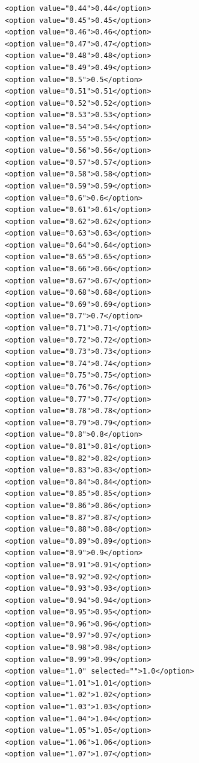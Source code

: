 \documentclass[
  letterpaper,
  DIV=11,
  numbers=noendperiod]{scrartcl}
\begin{document}
\begin{verbatim}
      <option value="0.44">0.44</option>
      <option value="0.45">0.45</option>
      <option value="0.46">0.46</option>
      <option value="0.47">0.47</option>
      <option value="0.48">0.48</option>
      <option value="0.49">0.49</option>
      <option value="0.5">0.5</option>
      <option value="0.51">0.51</option>
      <option value="0.52">0.52</option>
      <option value="0.53">0.53</option>
      <option value="0.54">0.54</option>
      <option value="0.55">0.55</option>
      <option value="0.56">0.56</option>
      <option value="0.57">0.57</option>
      <option value="0.58">0.58</option>
      <option value="0.59">0.59</option>
      <option value="0.6">0.6</option>
      <option value="0.61">0.61</option>
      <option value="0.62">0.62</option>
      <option value="0.63">0.63</option>
      <option value="0.64">0.64</option>
      <option value="0.65">0.65</option>
      <option value="0.66">0.66</option>
      <option value="0.67">0.67</option>
      <option value="0.68">0.68</option>
      <option value="0.69">0.69</option>
      <option value="0.7">0.7</option>
      <option value="0.71">0.71</option>
      <option value="0.72">0.72</option>
      <option value="0.73">0.73</option>
      <option value="0.74">0.74</option>
      <option value="0.75">0.75</option>
      <option value="0.76">0.76</option>
      <option value="0.77">0.77</option>
      <option value="0.78">0.78</option>
      <option value="0.79">0.79</option>
      <option value="0.8">0.8</option>
      <option value="0.81">0.81</option>
      <option value="0.82">0.82</option>
      <option value="0.83">0.83</option>
      <option value="0.84">0.84</option>
      <option value="0.85">0.85</option>
      <option value="0.86">0.86</option>
      <option value="0.87">0.87</option>
      <option value="0.88">0.88</option>
      <option value="0.89">0.89</option>
      <option value="0.9">0.9</option>
      <option value="0.91">0.91</option>
      <option value="0.92">0.92</option>
      <option value="0.93">0.93</option>
      <option value="0.94">0.94</option>
      <option value="0.95">0.95</option>
      <option value="0.96">0.96</option>
      <option value="0.97">0.97</option>
      <option value="0.98">0.98</option>
      <option value="0.99">0.99</option>
      <option value="1.0" selected="">1.0</option>
      <option value="1.01">1.01</option>
      <option value="1.02">1.02</option>
      <option value="1.03">1.03</option>
      <option value="1.04">1.04</option>
      <option value="1.05">1.05</option>
      <option value="1.06">1.06</option>
      <option value="1.07">1.07</option>

\end{verbatim}
\end{document}
